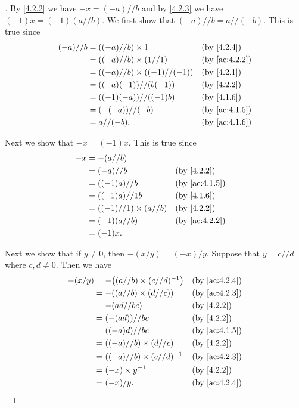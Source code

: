 \begin{proof}[]
  By \cref{4.2.2} we have \(-x = (-a) // b\) and by \cref{4.2.3} we have \((-1) x = (-1) (a // b)\).
  We first show that \((-a) // b = a // (-b)\).
  This is true since
  \begin{align*}
    (-a) // b & = ((-a) // b) \times 1              &  & \by{4.2.4}    \\
              & = ((-a) // b) \times (1 // 1)       &  & \by{ac:4.2.2} \\
              & = ((-a) // b) \times ((-1) // (-1)) &  & \by{4.2.1}    \\
              & = ((-a) (-1)) // (b (-1))           &  & \by{4.2.2}    \\
              & = ((-1) (-a)) // ((-1) b)           &  & \by{4.1.6}    \\
              & = (-(-a)) // (-b)                   &  & \by{ac:4.1.5} \\
              & = a // (-b).                        &  & \by{ac:4.1.6}
  \end{align*}

  Next we show that \(-x = (-1) x\).
  This is true since
  \begin{align*}
    -x & = -(a // b)                                      \\
       & = (-a) // b                   &  & \by{4.2.2}    \\
       & = ((-1) a) // b               &  & \by{ac:4.1.5} \\
       & = ((-1) a) // 1b              &  & \by{4.1.6}    \\
       & = ((-1) // 1) \times (a // b) &  & \by{4.2.2}    \\
       & = (-1) (a // b)               &  & \by{ac:4.2.2} \\
       & = (-1) x.
  \end{align*}

  Next we show that if \(y \neq 0\), then \(-(x / y) = (-x) / y\).
  Suppose that \(y = c // d\) where \(c, d \neq 0\).
  Then we have
  \begin{align*}
    -(x / y) & = -\pa{(a // b) \times (c // d)^{-1}} &  & \by{ac:4.2.4} \\
             & = -((a // b) \times (d // c))         &  & \by{ac:4.2.3} \\
             & = -(ad // bc)                         &  & \by{4.2.2}    \\
             & = (-(ad)) // bc                       &  & \by{4.2.2}    \\
             & = ((-a) d) // bc                      &  & \by{ac:4.1.5} \\
             & = ((-a) // b) \times (d // c)         &  & \by{4.2.2}    \\
             & = ((-a) // b) \times (c // d)^{-1}    &  & \by{ac:4.2.3} \\
             & = (-x) \times y^{-1}                  &  & \by{4.2.2}    \\
             & = (-x) / y.                           &  & \by{ac:4.2.4}
  \end{align*}


\end{proof}
